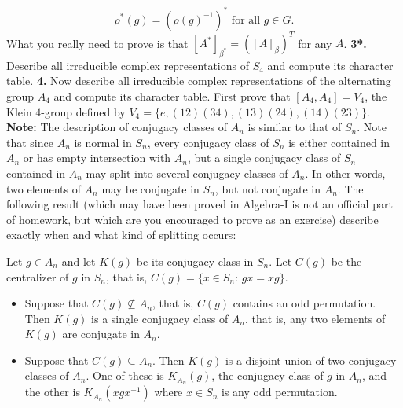 \documentclass[11pt]{amsart}
\begin{document}
$$ \rho^*(g)=(\rho(g)^{-1})^* \mbox{ for all }g\in G.$$
What you really need to prove is that $[A^*]_{\beta^*}=([A]_{\beta})^T$ for any $A$.
\skv
{\bf 3*.} Describe all irreducible complex representations of $S_4$ and compute its character table. 
\skv
\skv
{\bf 4.}  Now describe all irreducible complex representations of the alternating group $A_4$ and compute its character table.
First prove that $[A_4,A_4]=V_4$, the Klein $4$-group defined by
$V_4=\{e, (12)(34), (13)(24), (14)(23)\}$.
\skv
{\bf Note:} The description of conjugacy classes of $A_n$ is similar to that of $S_n$. Note that since $A_n$
is normal in $S_n$, every conjugacy class of $S_n$ is either contained in $A_n$ or has empty intersection with $A_n$,
but a single conjugacy class of $S_n$ contained in $A_n$ may split into several conjugacy classes of $A_n$. In other words, two elements of $A_n$ may be conjugate in $S_n$, but not conjugate in $A_n$. The following result (which may have been proved in Algebra-I is not an official part of homework, but which are you encouraged to prove as an exercise) describe exactly when and what kind of splitting occurs:
\skv

Let $g\in A_n$ and let $K(g)$ be its conjugacy class in $S_n$. Let $C(g)$ be the centralizer of $g$ in $S_n$, that is,
$C(g)=\{x\in S_n:\, gx=xg\}$.

\begin{itemize}
\item[(a)] Suppose that $C(g)\not\subseteq A_n$, that is, $C(g)$ contains an odd permutation. Then $K(g)$ is a single conjugacy class of $A_n$, that is, any two elements of $K(g)$ are conjugate in $A_n$.
\item[(b)] Suppose that $C(g)\subseteq A_n$. Then $K(g)$ is a disjoint union of two conjugacy classes of $A_n$. One
of these is $K_{A_n}(g)$, the conjugacy class of $g$ in $A_n$, and the other is $K_{A_n}(xgx^{-1})$ where $x\in S_n$
is any odd permutation.
\end{itemize}
\skv
\newpage
\end{document}
